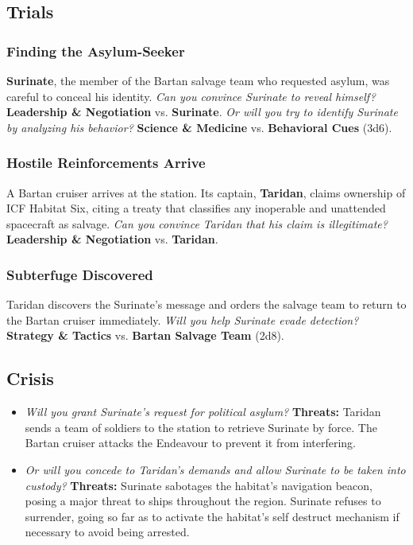 \documentclass[11pt, a5paper, parskip=half-, DIV=12]{scrartcl}
\begin{document}
\newpage

\subsection*{Trials}
\subsubsection*{Finding the Asylum-Seeker}
\textbf{Surinate}, the member of the Bartan salvage team who requested asylum, was careful to conceal his identity. \textit{Can you convince Surinate to reveal himself?} \textbf{Leadership \& Negotiation} vs. \textbf{Surinate}. \textit{Or will you try to identify Surinate by analyzing his behavior?}
\textbf{Science \& Medicine} vs. \textbf{Behavioral Cues} (3d6).

\subsubsection*{Hostile Reinforcements Arrive}
A Bartan cruiser arrives at the station.  Its captain, \textbf{Taridan}, claims ownership of ICF Habitat Six, citing a treaty that classifies any inoperable and unattended spacecraft as salvage. \textit{Can you convince Taridan that his claim is illegitimate?} \textbf{Leadership \& Negotiation} vs. \textbf{Taridan}.

\subsubsection*{Subterfuge Discovered}
Taridan discovers the Surinate's message and orders the salvage team to return to the Bartan cruiser immediately. \textit{Will you help Surinate evade detection?} \textbf{Strategy \& Tactics} vs. \textbf{Bartan Salvage Team} (2d8).

\subsection*{Crisis}
\begin{itemize}
	\item \textit{Will you grant Surinate's request for political asylum?} \textbf{Threats:} Taridan sends a team of soldiers to the station to retrieve Surinate by force. The Bartan cruiser attacks the Endeavour to prevent it from interfering.
	\item \textit{Or will you concede to Taridan's demands and allow Surinate to be taken into custody?} \textbf{Threats:} Surinate sabotages the habitat's navigation beacon, posing a major threat to ships throughout the region. Surinate refuses to surrender, going so far as to activate the habitat's self destruct mechanism if necessary to avoid being arrested.
\end{itemize}
\end{document}
